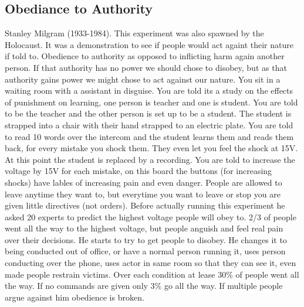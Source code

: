 \documentclass{article}
\begin{document}
\subsection*{Obediance to Authority}
Stanley Milgram (1933-1984). This experiment was also spawned by the Holocaust. It was a demonstration to see if people would act againt their nature if told to. Obedience to authority as opposed to inflicting harm again another person. If that authority has no power we should chose to disobey, but as that authority gains power we might chose to act against our nature. You sit in a waiting room with a assistant in disguise. You are told its a study on the effects of punishment on learning, one person is teacher and one is student. You are told to be the teacher and the other person is set up to be a student. The student is strapped into a chair with their hand strapped to an electric plate. You are told to read 10 words over the intercom and the student learns them and reads them back, for every mistake you shock them. They even let you feel the shock at 15V. At this point the student is replaced by a recording. You are told to increase the voltage by 15V for each mistake, on this board the buttons (for increasing shocks) have lables of increasing pain and even danger. People are allowed to leave anytime they want to, but everytime you want to leave or stop you are given little directives (not orders). Before actually running this experiment he asked 20 experts to predict the highest voltage people will obey to. 2/3 of people went all the way to the highest voltage, but people anguish and feel real pain over their decisions. He starts to try to get people to disobey. He changes it to being conducted out of office, or have a normal person running it, uses person conducting over the phone, uses actor in same room so that they can see it, even made people restrain victims. Over each condition at lease 30\% of people went all the way. If no commands are given only 3\% go all the way. If multiple people argue against him obedience is broken.
\end{document}
